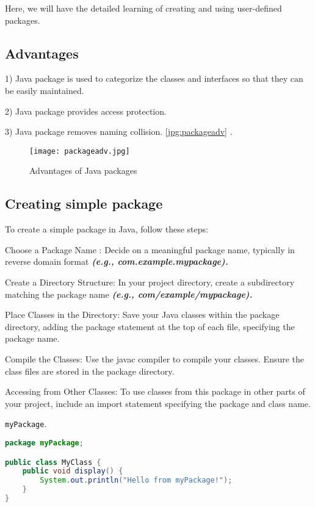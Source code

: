 \documentclass{article}
\begin{document}
Here, we will have the detailed learning of creating and using user-defined packages.


\subsection*{Advantages }
  1) Java package is used to categorize the classes and interfaces so that they can be easily maintained.

2) Java package provides access protection.

3) Java package removes naming collision.
 \ref{jpg:packageadv} .



\begin{figure}
\centering
\texttt{[image: packageadv.jpg]}
\caption{\label{fig:Adv}Advantages of Java packages}
\end{figure}

\subsection*{Creating simple package}
To create a simple package in Java, follow these steps:

Choose a Package Name
: Decide on a meaningful package name, typically in reverse domain format  \textbf{\textit{(e.g., com.example.mypackage).}}

Create a Directory Structure: In your project directory, create a subdirectory matching the package name \textbf{\textit{(e.g., com/example/mypackage).}}

Place Classes in the Directory: Save your Java classes within the package directory, adding the package statement at the top of each file, specifying the package name.

Compile the Classes: Use the javac compiler to compile your classes. Ensure the class files are stored in the package directory.

Accessing from Other Classes: To use classes from this package in other parts of your project, include an import statement specifying the package and class name.

\texttt{myPackage}.

\begin{lstlisting}[language=Java, backgroundcolor=\color{gray!10}]
package myPackage;

public class MyClass {
    public void display() {
        System.out.println("Hello from myPackage!");
    }
}
\end{lstlisting}
\end{document}
